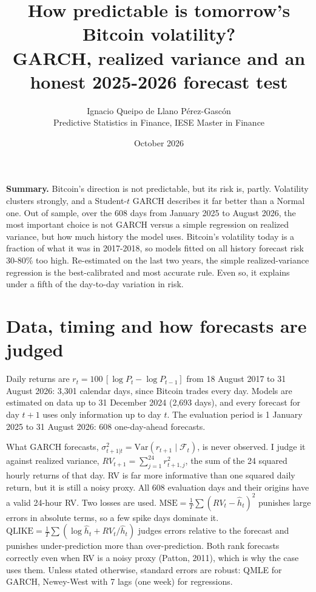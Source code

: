 \documentclass[10pt,a4paper]{article}
\title{\vspace{-1.2cm}\textbf{How predictable is tomorrow's Bitcoin volatility?}\\[2pt]
\large GARCH, realized variance and an honest 2025-2026 forecast test}
\author{Ignacio Queipo de Llano P\'erez-Gasc\'on\\\small Predictive Statistics in Finance, IESE Master in Finance}
\date{October 2026}
\begin{document}
\maketitle
\vspace{-0.6cm}

\begin{tcolorbox}[colback=white,colframe=black,boxrule=0.4pt,sharp corners,left=6pt,right=6pt,top=4pt,bottom=4pt]
\textbf{Summary.} Bitcoin's direction is not predictable, but its risk is, partly. Volatility clusters strongly, and a
Student-$t$ GARCH describes it far better than a Normal one. Out of sample, over the 608 days from January 2025 to
August 2026, the most important choice is not GARCH versus a simple regression on realized variance, but how much history
the model uses. Bitcoin's volatility today is a fraction of what it was in 2017-2018, so models fitted on all
history forecast risk 30-80\% too high. Re-estimated on the last two years, the simple realized-variance regression is the
best-calibrated and most accurate rule. Even so, it explains under a fifth of the day-to-day variation in risk.
\end{tcolorbox}

\section{Data, timing and how forecasts are judged}

Daily returns are $r_t = 100\,[\log P_t - \log P_{t-1}]$ from 18 August 2017 to 31 August 2026: 3,301 calendar days,
since Bitcoin trades every day. Models are estimated on data up to 31 December 2024 (2,693 days), and every forecast
for day $t+1$ uses only information up to day $t$. The evaluation period is 1 January 2025 to 31 August 2026: 608
one-day-ahead forecasts.

What GARCH forecasts, $\sigma^2_{t+1|t}=\mathrm{Var}(r_{t+1}\mid\mathcal F_t)$, is never observed. I judge it against
realized variance, $RV_{t+1}=\sum_{j=1}^{24} r_{t+1,j}^2$, the sum of the 24 squared hourly returns of that day. RV is
far more informative than one squared daily return, but it is still a noisy proxy. All 608 evaluation days and their
origins have a valid 24-hour RV. Two losses are used. $\text{MSE}=\frac1T\sum(RV_t-\hat h_t)^2$ punishes large
errors in absolute terms, so a few spike days dominate it. $\text{QLIKE}=\frac1T\sum(\log\hat h_t+RV_t/\hat h_t)$ judges
errors relative to the forecast and punishes under-prediction more than over-prediction. Both rank forecasts correctly
even when RV is a noisy proxy (Patton, 2011), which is why the case uses them. Unless stated otherwise, standard errors
are robust: QMLE for GARCH, Newey-West with 7 lags (one week) for regressions.
\end{document}
